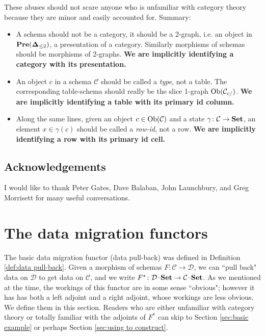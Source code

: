 \documentclass{amsart}
\def\tn{\textnormal}
\def\mc{\mathcal}
\def\Ob{\tn{Ob}}
\def\to{\rightarrow}
\def\taking{\colon}
\def\Set{{\bf Set}}
\def\set{{\text \textendash}{\bf Set}}
\def\Pre{{\bf Pre}}
\def\mcC{\mc{C}}
\def\mcD{\mc{D}}
\theoremstyle{remark}
\theoremstyle{definition}
\begin{document}
These abuses should not scare anyone who is unfamiliar with category theory because they are minor and easily accounted for.  Summary: \begin{itemize}\item A schema should not be a category, it should be a 2-graph, i.e. an object in $\Pre({\bf\Delta}_{\leq 2})$, a presentation of a category.  Similarly morphisms of schemas should be morphisms of 2-graphs.  {\bf We are implicitly identifying a category with its presentation.}  \item An object $c$ in a schema $\mcC$ should be called a {\em type}, not a table.  The corresponding table-schema should really be the slice 1-graph $\Ob(\mcC_{c/})$.  {\bf We are implicitly identifying a table with its primary id column.}\item Along the same lines, given an object $c\in\Ob(\mcC)$ and a state $\gamma\taking\mcC\to\Set$, an element $x\in\gamma(c)$ should be called a {\em row-id}, not a row.  {\bf We are implicitly identifying a row with its primary id cell.}  \end{itemize}



\subsection{Acknowledgements}

I would like to thank Peter Gates, Dave Balaban, John Launchbury, and Greg Morrisett for many useful conversations.

\section{The data migration functors}\label{sec:dlf}

The basic data migration functor (data pull-back) was defined in Definition \ref{def:data pull-back}.  Given a morphism of schemas $F\taking\mcC\to\mcD$, we can ``pull back" data on $\mcD$ to get data on $\mcC$, and we write $F^*\taking\mcD\set\to\mcC\set$.  As we mentioned at the time, the workings of this functor are in some sense ``obvious"; however it has has both a left adjoint and a right adjoint, whose workings are less obvious.  We define them in this section.  Readers who are either unfamiliar with category theory or totally familiar with the adjoints of $F^*$ can skip to Section \ref{sec:basic example} or perhaps Section \ref{sec:using to construct}.
\end{document}
